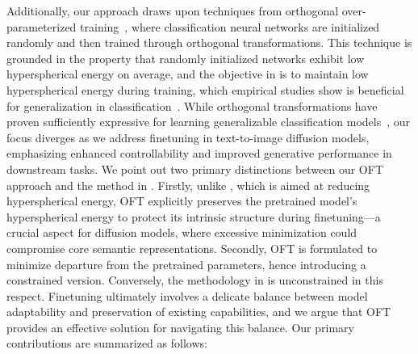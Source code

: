 Additionally, our approach draws upon techniques from orthogonal over-parameterized training~\cite{liu2021orthogonal}, where classification neural networks are initialized randomly and then trained through orthogonal transformations. This technique is grounded in the property that randomly initialized networks exhibit low hyperspherical energy on average, and the objective in \cite{liu2021orthogonal} is to maintain low hyperspherical energy during training, which empirical studies show is beneficial for generalization in classification~\cite{liu2018learning,lin2020regularizing}. While orthogonal transformations have proven sufficiently expressive for learning generalizable classification models~\cite{liu2021orthogonal}, our focus diverges as we address finetuning in text-to-image diffusion models, emphasizing enhanced controllability and improved generative performance in downstream tasks. We point out two primary distinctions between our OFT approach and the method in \cite{liu2021orthogonal}. Firstly, unlike \cite{liu2021orthogonal}, which is aimed at reducing hyperspherical energy, OFT explicitly preserves the pretrained model’s hyperspherical energy to protect its intrinsic structure during finetuning—a crucial aspect for diffusion models, where excessive minimization could compromise core semantic representations. Secondly, OFT is formulated to minimize departure from the pretrained parameters, hence introducing a constrained version. Conversely, the methodology in \cite{liu2021orthogonal} is unconstrained in this respect. Finetuning ultimately involves a delicate balance between model adaptability and preservation of existing capabilities, and we argue that OFT provides an effective solution for navigating this balance. Our primary contributions are summarized as follows:

